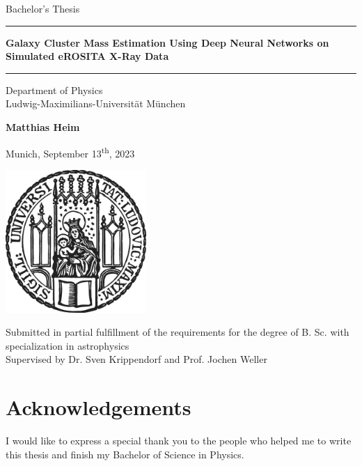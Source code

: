 \documentclass[12pt]{article}
\newcommand{\mytitle}{Galaxy Cluster Mass Estimation Using Deep Neural Networks on Simulated eROSITA X-Ray Data}
\newcommand{\myname}{Matthias Heim}
\newcommand{\mysupervisor}{Dr. Sven Krippendorf and Prof. Jochen Weller}
\numberwithin{equation}{subsection}
\begin{document}
\begin{titlepage}
\begin{center}
    
\LARGE
Bachelor's Thesis
    
\vspace{0.5cm}
      
\rule{\textwidth}{1.5pt}
\LARGE
\textbf{\mytitle}
\rule{\textwidth}{1.5pt}
   
\vspace{0.5cm}
      
\large
Department of Physics \\
Ludwig-Maximilians-Universität München 

\vfill

\Large
\textbf{\myname}

\vfill

\large
Munich, September 13\textsuperscript{th}, 2023
      
\vfill

\includegraphics[width = 0.4\textwidth]{sigillum.png}

\vfill

\normalsize
Submitted in partial fulfillment of the requirements for the degree of B. Sc. with specialization in astrophysics
\\

Supervised by \mysupervisor

\end{center}
\end{titlepage}

\thispagestyle{empty}
\section*{Acknowledgements}
I would like to express a special thank you to the people who helped me to write this thesis and finish my Bachelor of Science in Physics.\\
\end{document}
